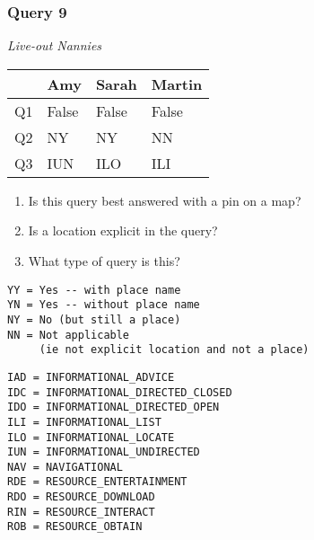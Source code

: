 \begin{frame}[fragile]
\frametitle{Query 9}
\vspace{1em}

\emph{Live-out Nannies}

\vfill

\begin{table}
  \centering
  \begin{tabular}{ l l l l }
    & \textbf{Amy} & \textbf{Sarah} & \textbf{Martin}\\
    \toprule
    Q1 & False & False & False\\
Q2 & NY & NY & NN\\
Q3 & IUN & ILO & ILI\\
    \bottomrule
  \end{tabular}
\end{table}

\vfill

\tiny{

\begin{enumerate}
\item Is this query best answered with a pin on a map?
\item Is a location explicit in the query?
\item What type of query is this?
\end{enumerate}

\vfill

\begin{multicols}{2}
\begin{verbatim}
YY = Yes -- with place name
YN = Yes -- without place name
NY = No (but still a place)
NN = Not applicable 
     (ie not explicit location and not a place)
\end{verbatim}

\columnbreak
\begin{verbatim}
IAD = INFORMATIONAL_ADVICE
IDC = INFORMATIONAL_DIRECTED_CLOSED
IDO = INFORMATIONAL_DIRECTED_OPEN
ILI = INFORMATIONAL_LIST
ILO = INFORMATIONAL_LOCATE
IUN = INFORMATIONAL_UNDIRECTED
NAV = NAVIGATIONAL
RDE = RESOURCE_ENTERTAINMENT
RDO = RESOURCE_DOWNLOAD
RIN = RESOURCE_INTERACT
ROB = RESOURCE_OBTAIN
\end{verbatim}
\end{multicols}
}

\end{frame}


